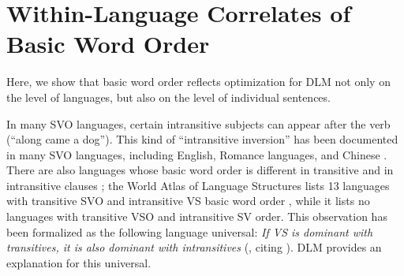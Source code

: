 \documentclass[11pt,a4paper]{article}
\begin{document}








\section{Within-Language Correlates of Basic Word Order}

Here, we show that basic word order reflects optimization for DLM not only on the level of languages, but also on the level of individual sentences.

In many SVO languages, certain intransitive subjects can appear after the verb (``along came a dog'').
This kind of ``intransitive inversion'' has been documented in many SVO languages, including English, Romance languages, and Chinese \citep[Chapter 17.2]{li1981mandarin}.
There are also languages whose basic word order is different in transitive and in intransitive clauses \citep{wals-82}; the World Atlas of Language Structures lists 13 languages with transitive SVO and intransitive VS basic word order \citep{wals-81,wals-82}, while it lists no languages with transitive VSO and intransitive SV order.
This observation has been formalized as the following language universal: \textit{If VS is dominant with transitives, it is also dominant with intransitives} (\citet[No 344]{plank2000the}, citing \citet{kozinsky1981Nekotorye}).
DLM provides an explanation for this universal.
\end{document}
